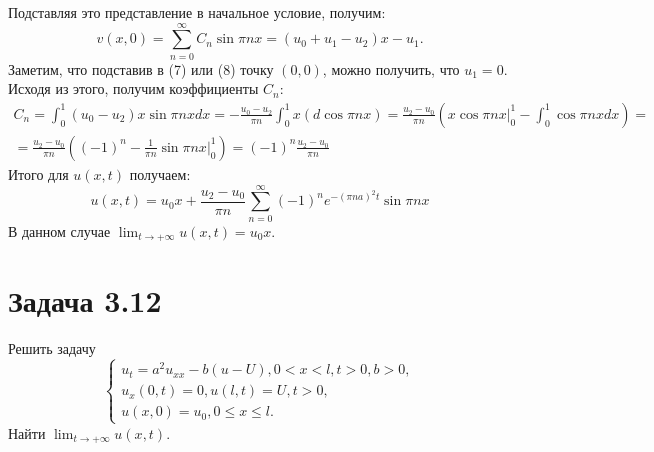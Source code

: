 \documentclass[11pt]{article}
\begin{document}
Подставляя это представление в начальное условие, получим:
\begin{equation*}
v(x, 0) = \sum_{n = 0}^{\infty}C_n\sin\pi nx = (u_0 + u_1 - u_2)x - u_1.
\end{equation*}
Заметим, что подставив в (7) или (8) точку $(0, 0)$, можно получить, что $u_1 = 0$.
Исходя из этого, получим коэффициенты $C_n$:
\begin{multline*}
C_n = \int_0^1(u_0 - u_2)x\sin\pi nxdx = -\frac{u_0 - u_2}{\pi n}\int_0^1x(d\cos\pi nx) =
\frac{u_2 - u_0}{\pi n}(x\cos\pi nx|_0^1 - \int_0^1\cos\pi nxdx) = \\
= \frac{u_2 - u_0}{\pi n}\left((-1)^n - \frac1{\pi n}\sin\pi nx|_0^1\right) =
(-1)^n\frac{u_2 - u_0}{\pi n}
\end{multline*}
Итого для $u(x, t)$ получаем:
\begin{equation}
u(x, t) = u_0x + \frac{u_2 - u_0}{\pi n}\sum_{n = 0}^{\infty}(-1)^ne^{-(\pi na)^2t}\sin{\pi nx}
\end{equation}
В данном случае $\lim_{t \to +\infty}u(x, t) = u_0x$.
\section{Задача 3.12}
\label{sec:org81ced67}
Решить задачу
\begin{equation}
\begin{cases}
u_t = a^2u_{xx} - b(u - U), 0 < x < l, t > 0, b > 0, \\
u_x(0, t) = 0, u(l, t) = U, t > 0, \\
u(x, 0) = u_0, 0 \leq x \leq l.
\end{cases}
\end{equation}
Найти $\lim_{t \to +\infty}u(x, t)$.
\end{document}

